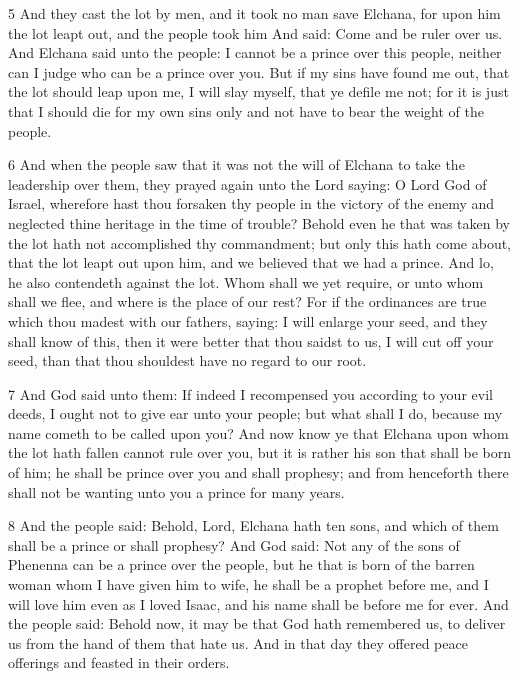 \par 5 And they cast the lot by men, and it took no man save Elchana, for upon him the lot leapt out, and the people took him And said: Come and be ruler over us. And Elchana said unto the people: I cannot be a prince over this people, neither can I judge who can be a prince over you. But if my sins have found me out, that the lot should leap upon me, I will slay myself, that ye defile me not; for it is just that I should die for my own sins only and not have to bear the weight of the people.

\par 6 And when the people saw that it was not the will of Elchana to take the leadership over them, they prayed again unto the Lord saying: O Lord God of Israel, wherefore hast thou forsaken thy people in the victory of the enemy and neglected thine heritage in the time of trouble? Behold even he that was taken by the lot hath not accomplished thy commandment; but only this hath come about, that the lot leapt out upon him, and we believed that we had a prince. And lo, he also contendeth against the lot. Whom shall we yet require, or unto whom shall we flee, and where is the place of our rest? For if the ordinances are true which thou madest with our fathers, saying: I will enlarge your seed, and they shall know of this, then it were better that thou saidst to us, I will cut off your seed, than that thou shouldest have no regard to our root. 

\par 7 And God said unto them: If indeed I recompensed you according to your evil deeds, I ought not to give ear unto your people; but what shall I do, because my name cometh to be called upon you? And now know ye that Elchana upon whom the lot hath fallen cannot rule over you, but it is rather his son that shall be born of him; he shall be prince over you and shall prophesy; and from henceforth there shall not be wanting unto you a prince for many years. 

\par 8 And the people said: Behold, Lord, Elchana hath ten sons, and which of them shall be a prince or shall prophesy? And God said: Not any of the sons of Phenenna can be a prince over the people, but he that is born of the barren woman whom I have given him to wife, he shall be a prophet before me, and I will love him even as I loved Isaac, and his name shall be before me for ever. And the people said: Behold now, it may be that God hath remembered us, to deliver us from the hand of them that hate us. And in that day they offered peace offerings and feasted in their orders.


